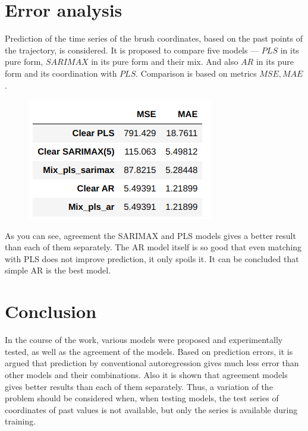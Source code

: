 \documentclass{article}
\begin{document}
\section{Error analysis}
Prediction of the time series of the brush coordinates, based on the past points of the trajectory, is considered. It is proposed to compare five models --- $ PLS $ in its pure form, $ SARIMAX $ in its pure form and their mix. And also $ AR $ in its pure form and its coordination with $ PLS $. Comparison is based on metrics $MSE, MAE$.
\begin{figure}[H]
\includegraphics[scale=1]{images/7.png}
\end{figure}
As you can see, agreement the SARIMAX and PLS models gives a better result than each of them separately. The AR model itself is so good that even matching with PLS does not improve prediction, it only spoils it. It can be concluded that simple AR is the best model.
\section{Conclusion}
In the course of the work, various models were proposed and experimentally tested, as well as the agreement of the models.  Based on prediction errors, it is argued that prediction by conventional autoregression gives much less error than other models and their combinations. Also it is shown that agreement models gives better results than each of them separately. Thus, a variation of the problem should be considered when, when testing models, the test series of coordinates of past values is not available, but only the series is available during training. 


\nocite{*}


\end{document}

